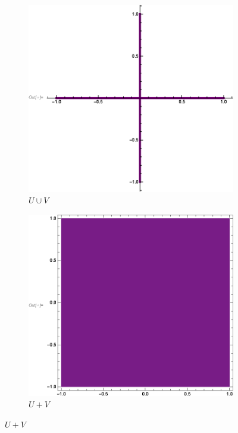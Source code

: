 \documentclass[12pt, t]{beamer}
\begin{document}
\begin{frame}[allowframebreaks]
\begin{figure}[ht]
\begin{subfigure}[b]{0.2\textwidth}
        \end{subfigure}
        \begin{subfigure}[b]{0.2\textwidth}
            \centering
            \includegraphics[width=\linewidth]{u+w_gr3.eps}
            \caption{$U\cup V$}
        \end{subfigure}
        \begin{subfigure}[b]{0.2\textwidth}
            \centering
            \includegraphics[width=\linewidth]{u+w_gr4.eps}
            \caption{$U+V$}
        \end{subfigure}
    \end{figure}


\end{frame}
\end{document}
